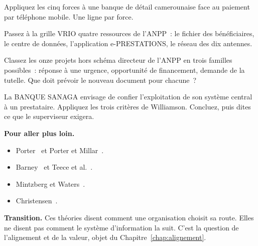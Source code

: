 \begin{boxexo}[title={\ding{45}\quad Exercice~2.1. Cinq forces \niveaubase}]
Appliquez les cinq forces à une banque de détail camerounaise face au paiement par téléphone mobile. Une ligne par force.
\end{boxexo}

\begin{boxexo}[title={\ding{45}\quad Exercice~2.2. VRIO \niveaumoyen}]
Passez à la grille VRIO quatre ressources de l'ANPP~: le fichier des bénéficiaires, le centre de données, l'application e-PRESTATIONS, le réseau des dix antennes.
\end{boxexo}

\begin{boxexo}[title={\ding{45}\quad Exercice~2.3. Délibéré, émergent \niveaumoyen}]
Classez les onze projets hors schéma directeur de l'ANPP en trois familles possibles~: réponse à une urgence, opportunité de financement, demande de la tutelle. Que doit prévoir le nouveau document pour chacune~?
\end{boxexo}

\begin{boxexo}[title={\ding{45}\quad Exercice~2.4. Faire ou faire faire \niveauexpert}]
La BANQUE SANAGA envisage de confier l'exploitation de son système central à un prestataire. Appliquez les trois critères de Williamson. Concluez, puis dites ce que le superviseur exigera.
\end{boxexo}

\bigskip

\begin{boxinfo}
\textbf{Pour aller plus loin.}
\begin{itemize}
    \item Porter~\cite{porter1980,porter1985} et Porter et Millar~\cite{portermillar1985}.
    \item Barney~\cite{barney1991} et Teece et al.~\cite{teece1997}.
    \item Mintzberg et Waters~\cite{mintzberg1985}.
    \item Christensen~\cite{christensen1997}.
\end{itemize}
\end{boxinfo}

\begin{boxinfo}
\textbf{Transition.} Ces théories disent comment une organisation choisit sa route. Elles ne disent pas comment le système d'information la suit. C'est la question de l'alignement et de la valeur, objet du Chapitre~\ref{chap:alignement}.
\end{boxinfo}
